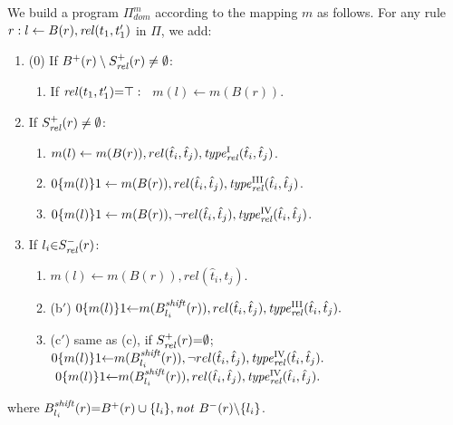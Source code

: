 \documentclass{new_tlp}
\def\mi#1{\mathit{#1\/}}
\def\be{\begin{enumerate}}
\def\ee{\end{enumerate}}
\begin{document}
We build a program $\Pi_{dom}^m$ according to the mapping $m$ %
as follows. 
For any rule $r: l \leftarrow B(r), \mi{rel}(t_1,t_1')$ in $\Pi$, we
add:
\vspace*{-.125\baselineskip}
{%
\be{}

\item[(0)] If $B^+(r)\setminus S^+_{\mi{rel}}(r)\neq \emptyset$:
\vspace*{-.25\baselineskip}
\be [$~\hspace{-1.5em}$(a)]
\item If $\mi{rel}(t_1,t_1'){=} \top:$~ $m(l) \leftarrow m(B(r))$. 
\ee
\vspace*{-.25\baselineskip}

\item If $S_{\mi{rel}}^+(r)\neq \emptyset$:
\vspace*{-.35\baselineskip}
\be [$~\hspace{-1.5em}$(a)]
\itemsep=3pt
\item $m(l) \leftarrow m(B(r)), {rel}(\hat{t}_i,\hat{t}_j),\mi{type}^{\textup{I}}_{\mi{rel}}(\hat{t}_i,\hat{t}_j)$.
\item $0\{m(l)\}1 \leftarrow m(B(r)), {rel}(\hat{t}_i,\hat{t}_j),\mi{type}^{\textup{III}}_{\mi{rel}}(\hat{t}_i,\hat{t}_j)$.
\item $0\{m(l)\}1 \leftarrow m(B(r)), \neg {rel}(\hat{t}_i,\hat{t}_j),\mi{type}^{\textup{IV}}_{\mi{rel}}(\hat{t}_i,\hat{t}_j)$.
\ee
\vspace*{-.25\baselineskip}
\item If $l_i {\in} S_{\mi{rel}}^-(r)$: %
\vspace*{-.2\baselineskip}
\be [$~\hspace{-2em}$(a$'$)] 
\itemsep=3pt
\item $m(l) {\leftarrow} m(B(r)), {rel}(\hat{t}_i,\hat{t}_j).$
\item[(b$'$)] $0\{m(l)\}1 {\leftarrow} m(B^{\mi{shift}}_{l_i}(r)), {rel}(\hat{t}_i,\hat{t}_j), \mi{type}^{\textup{III}}_{\mi{rel}}(\hat{t}_i,\hat{t}_j).$  
\item[(c$'$)] same as (c), if $S_{\mi{rel}}^+(r){=} \emptyset$;\\[1pt]
$ 0\{m(l)\}1 {\leftarrow} m(B^{\mi{shift}}_{l_i}(r)), \neg {rel}(\hat{t}_i,\hat{t}_j),\mi{type}^{\textup{IV}}_{\mi{rel}}(\hat{t}_i,\hat{t}_j).$ \\[1pt]
$~0\{m(l)\}1 {\leftarrow} m(B^{\mi{shift}}_{l_i}(r)), {rel}(\hat{t}_i,\hat{t}_j), \mi{type}^{\textup{IV}}_{\mi{rel}}(\hat{t}_i,\hat{t}_j).$  %
\ee
\vspace*{-.3\baselineskip}
\ee
}
\noindent where $B^{\mi{shift}}_{l_i}(r){=}B^+(r)\cup \{l_i\},\mi{not}\ B^-(r){\setminus} \{l_i\}$.
\end{document}
